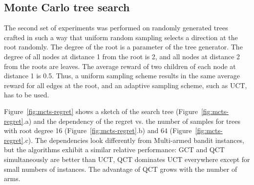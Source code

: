 \documentclass{article}
\begin{document}
\subsection{Monte Carlo tree search}
\label{seq:emp-mcts}

The second set of experiments was performed on randomly generated
trees crafted in such a way that uniform random sampling selects a
direction at the root randomly. The degree of the root is a parameter of
the tree generator. The degree of all nodes at distance 1 from the
root is 2, and all nodes at distance 2 from the roots are leaves. The
average reward of two children of each node at distance 1 is
0.5. Thus, a uniform sampling scheme results in the same average reward for
all edges at the root, and an adaptive sampling scheme, such as UCT,
has to be used.

Figure~\ref{fig:mcts-regret} shows a sketch of the search tree
(Figure~\ref{fig:mcts-regret}.a) and the dependency of the regret vs. the
number of samples for trees with root degree 16
(Figure~\ref{fig:mcts-regret}.b) and 64 (Figure~\ref{fig:mcts-regret}.c). The
dependencies look differently from Multi-armed bandit instances, but
the algorithms exhibit a similar relative performance: GCT and QCT
simultaneously are better than UCT, QCT dominates UCT everywhere
except for small numbers of instances. The advantage of QCT grows with
the number of arms.
\end{document}
